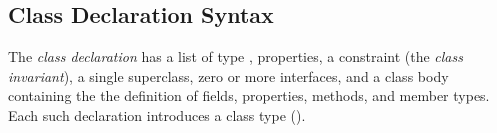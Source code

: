   
 
\subsection{Class Declaration Syntax}

The {\em class declaration} has a list of type \params, properties, a
constraint (the {\em class invariant}), a single superclass, zero or more
interfaces, and a class body containing the the definition of fields,
properties, methods, and member types. Each such declaration introduces a
class type ().


 




